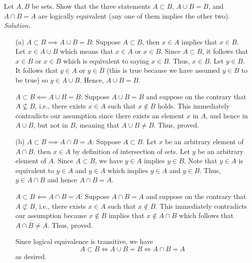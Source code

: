 \documentclass{amsart}
\theoremstyle{definition}
\newcommand{\soln}{\newline\textit{Solution.} }
\begin{document}
\subsubsection{} Let $A,B$ be sets. Show that the three statements $A\subset B$, $A\cup B=B$, and $A\cap B=A$ are logically equivalent (any one of them implies the other two). \\
\soln 
\begin{enumerate}
\item[(a)] $A\subset B\implies A\cup B=B$: Suppose $A\subset B$, then $x\in A$ implies that $x\in B$. Let $x\in A\cup B$ which means that $x\in A$ or $x\in B$. Since $A\subset B$, it follows that $x\in B$ or $x\in B$ which is equivalent to saying $x\in B$. Thus, $x\in B$. Let $y\in B$. It follows that $y\in A$ or $y\in B$ (this is true because we have assumed $y\in B$ to be true) so $y\in A\cup B$. Hence, $A\cup B=B$. \\
\item[] $A\subset B\impliedby A\cup B=B$: Suppose $A\cup B=B$ and suppose on the contrary that $A\not\subseteq B$, i.e., there exists $x\in A$ such that $x\notin B$ holds. This immediately contradicts our assumption since there exists an element $x$ in $A$, and hence in $A\cup B$, but not in $B$, meaning that $A\cup B\neq B$. Thus, proved. \\
\item[(b)] $A\subset B\implies A\cap B=A$: Suppose $A\subset B$. Let $x$ be an arbitrary element of $A\cap B$, then $x\in A$ by definition of intersection of sets. Let $y$ be an arbitrary element of $A$. Since $A\subset B$, we have $y\in A$ implies $y\in B$. Note that $y\in A$ is equivalent to $y\in A$ and $y\in A$ which implies $y\in A$ and $y\in B$. Thus, $y\in A\cap B$ and hence $A\cap B=A$. \\
\item[] $A\subset B\impliedby A\cap B=A$: Suppose $A\cap B=A$ and suppose on the contrary that $A\not\subset B$, i.e., there exists $x\in A$ such that $x\notin B$. This immediately contradicts our assumption because $x\notin B$ implies that $x\notin A\cap B$ which follows that $A\cap B\neq A$. Thus, proved. \\
\item [] Since logical equivalence is transitive, we have \[A\subset B\iff A\cup B=B\iff A\cap B=A\] as desired. \\
\end{enumerate} 
\end{document}
